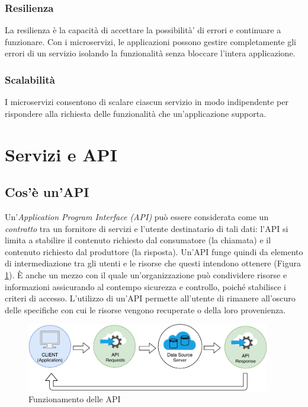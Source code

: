 \subsubsection{Resilienza}
La resilienza è la capacità di accettare la possibilità’ di errori e continuare a funzionare. Con i microservizi, le applicazioni possono gestire completamente gli errori di un servizio isolando la funzionalità senza bloccare l’intera applicazione.

\subsubsection{Scalabilità}
I microservizi consentono di scalare ciascun servizio in modo indipendente per rispondere alla richiesta delle funzionalità che un'applicazione supporta. 


\section{Servizi e API}

\subsection{Cos'è un'API}
Un'\textit{Application Program Interface (API)} può essere considerata come un \emph{contratto} tra un fornitore di servizi e l'utente destinatario di tali dati: l'API si limita a stabilire il contenuto richiesto dal consumatore (la chiamata) e il contenuto richiesto dal produttore (la risposta). Un'API funge quindi da elemento di intermediazione tra gli utenti e le risorse che questi intendono ottenere (Figura \ref{fig:api}). È anche un mezzo con il quale un'organizzazione può condividere risorse e informazioni assicurando al contempo sicurezza e controllo, poiché stabilisce i criteri di accesso. L'utilizzo di un'API permette all'utente di rimanere all'oscuro delle specifiche con cui le risorse vengono recuperate o della loro provenienza.
\begin{figure}[H]
    \centering
    \includegraphics[width=0.95\textwidth]{images/01_9_api.pdf}
    \caption{Funzionamento delle API}
    \label{fig:api}
\end{figure}

